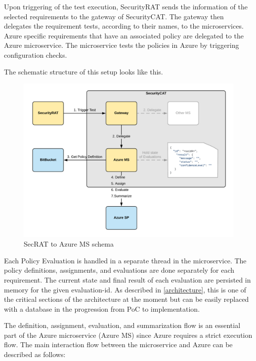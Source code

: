 Upon triggering of the test execution, SecurityRAT sends the information of the selected requirements to the gateway of SecurityCAT. The gateway then delegates the requirement tests, according to their names, to the microservices. Azure specific requirements that have an associated policy are delegated to the Azure microservice. The microservice tests the policies in Azure by triggering configuration checks.

The schematic structure of this setup looks like this.

\newpage

\begin{figure}[ht!]
\begin{center}
\includegraphics[width=15cm]{Azure_MS_flow.png}
\end{center}
\caption[SecurityRAT to Azure MS schema]{SecRAT to Azure MS schema}
\end{figure}

Each Policy Evaluation is handled in a separate thread in the microservice. The policy definitions, assignments, and evaluations are done separately for each requirement.
The current state and final result of each evaluation are persisted in memory for the given evaluation-id. As described in \ref{architecture}, this is one of the critical sections of the architecture at the moment but can be easily replaced with a database in the progression from PoC to implementation. 

The definition, assignment, evaluation, and summarization flow is an essential part of the Azure microservice (Azure MS) since Azure requires a strict execution flow.
The main interaction flow between the microservice and Azure can be described as follows:

